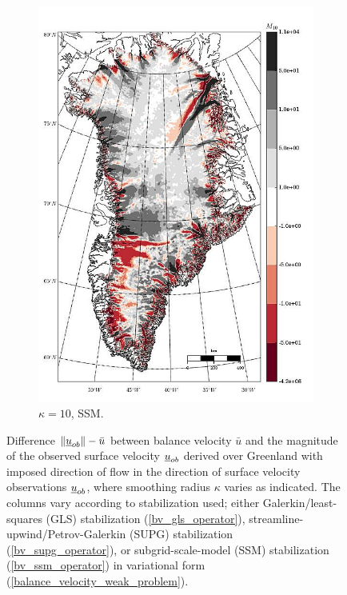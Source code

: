\begin{figure}
\begin{subfigure}[b]{0.25\linewidth}
    \includegraphics[width=\linewidth]{images/balance_velocity/greenland/d_U_ob/misfit_5H_kappa_10_SSM.jpg}
  \caption{$\kappa = 10$, SSM.}
  \label{greenland_bv_image_d_U_ob_kappa_10_SSM_misfit}
  \end{subfigure}
 
  \caption[Greenland balance-velocity misfit with $\mathbf{d}^{\text{data}} = \mathbf{u}_{ob}$.]{Difference $\Vert \underline{u}_{ob} \Vert - \bar{u}$ between balance velocity $\bar{u}$ and the magnitude of the observed surface velocity $\underline{u}_{ob}$ derived over Greenland with imposed direction of flow in the direction of surface velocity observations $\underline{u}_{ob}$, where smoothing radius $\kappa$ varies as indicated.  The columns vary according to stabilization used; either Galerkin/least-squares (GLS) stabilization (\ref{bv_gls_operator}), streamline-upwind/Petrov-Galerkin (SUPG) stabilization (\ref{bv_supg_operator}), or subgrid-scale-model (SSM) stabilization (\ref{bv_ssm_operator}) in variational form (\ref{balance_velocity_weak_problem}).}

  \label{greenland_bv_image_d_U_ob_misfit}

\end{figure}

